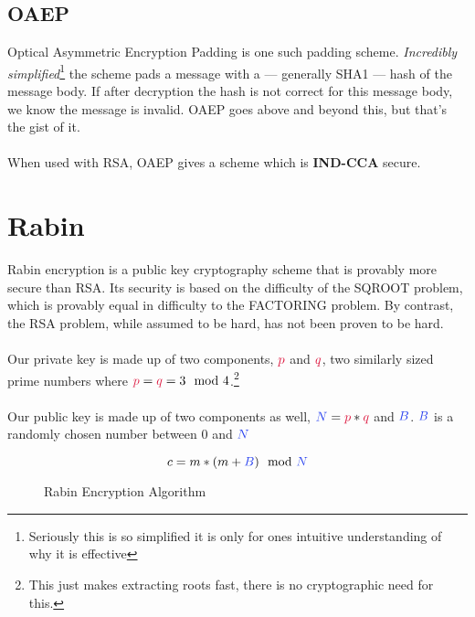 	\subsection{OAEP}
		Optical Asymmetric Encryption Padding is one such padding scheme. \textit{Incredibly simplified}\footnote{Seriously this is so simplified it is only for ones intuitive understanding of why it is effective} the scheme pads a message with a --- generally SHA1 --- hash of the message body. If after decryption the hash is not correct for this message body, we know the message is invalid. OAEP goes above and beyond this, but that's the gist of it.\\
		\\
		When used with RSA, OAEP gives a scheme which is \textbf{IND-CCA} secure.


\section{Rabin}
	Rabin encryption is a public key cryptography scheme that is provably more secure than RSA. Its security is based on the difficulty of the SQROOT problem, which is provably equal in difficulty to the FACTORING problem. By contrast, the RSA problem, while assumed to be hard, has not been proven to be hard.\\
	\\
	Our private key is made up of two components, $\textcolor{R}{p}$ and $\textcolor{R}{q}$, two similarly sized prime numbers where $\textcolor{R}{p} = \textcolor{R}{q} = 3 \mod 4$.\footnote{This just makes extracting roots fast, there is no cryptographic need for this.}\\
	\\
	Our public key is made up of two components as well, $\textcolor{B}{N} = \textcolor{R}{p}*\textcolor{R}{q}$ and $\textcolor{B}{B}$. $\textcolor{B}{B}$ is a randomly chosen number between $0$ and $\textcolor{B}{N}$\\
  \begin{figure}[htp!]
		$$c = m * (m + \textcolor{B}{B}) \mod \textcolor{B}{N}$$
  \caption{Rabin Encryption Algorithm}
  \label{fig:rabin-enc}
  \end{figure}

